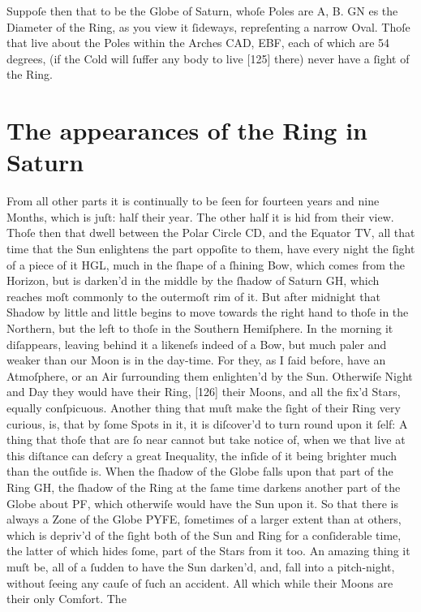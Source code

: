 \documentclass[letterpaper]{book}
\begin{document}
Suppoſe then that to be the Globe of Saturn, whoſe Poles are A, B.
GN es the Diameter of the Ring, as you view it ſideways, repreſenting a
narrow Oval. Thoſe that live about the Poles within the Arches CAD, EBF,
each of which are 54 degrees, (if the Cold will ſuffer any body to live
[125] there) never have a ſight of the Ring.


\section{The appearances of the Ring in Saturn}

From all other parts it is continually to be ſeen for fourteen years and
nine Months, which is juſt: half their year. The other half it is hid from
their view. Thoſe then that dwell between the Polar Circle CD, and the
Equator TV, all that time that the Sun enlightens the part oppoſite to them,
have every night the ſight of a piece of it HGL, much in the ſhape of a
ſhining Bow, which comes from the Horizon, but is darken'd in the middle by
the ſhadow of Saturn GH, which reaches moſt commonly to the outermoſt rim of
it. But after midnight that Shadow by little and little begins to move
towards the right hand to thoſe in the Northern, but the left to thoſe in
the Southern Hemiſphere. In the morning it diſappears, leaving behind it a
likeneſs indeed of a Bow, but much paler and weaker than our Moon is in the
day-time. For they, as I ſaid before, have an Atmoſphere, or an Air
ſurrounding them enlighten'd by the Sun. Otherwiſe Night and Day they would
have their Ring, [126] their Moons, and all the fix'd Stars, equally
conſpicuous. Another thing that muſt make the ſight of their Ring very
curious, is, that by ſome Spots in it, it is diſcover'd to turn round upon
it ſelf: A thing that thoſe that are ſo near cannot but take notice of, when
we that live at this diſtance can deſcry a great Inequality, the inſide of
it being brighter much than the outſide is. When the ſhadow of the Globe
falls upon that part of the Ring GH, the ſhadow of the Ring at the ſame time
darkens another part of the Globe about PF, which otherwiſe would have the
Sun upon it. So that there is always a Zone of the Globe PYFE, ſometimes of a
larger extent than at others, which is depriv'd of the ſight both of the Sun
and Ring for a conſiderable time, the latter of which hides ſome, part of
the Stars from it too. An amazing thing it muſt be, all of a ſudden to have
the Sun darken'd, and, fall into a pitch-night, without ſeeing any cauſe of
ſuch an accident. All which while their Moons are their only Comfort.  The
\end{document}
